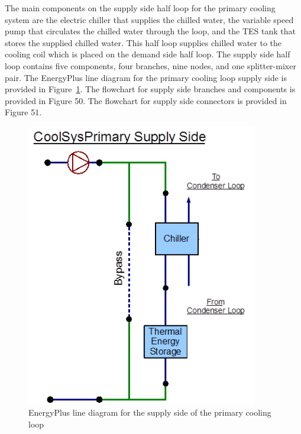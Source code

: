 The main components on the supply side half loop for the primary cooling system are the electric chiller that supplies the chilled water, the variable speed pump that circulates the chilled water through the loop, and the TES tank that stores the supplied chilled water. This half loop supplies chilled water to the cooling coil which is placed on the demand side half loop. The supply side half loop contains five components, four branches, nine nodes, and one splitter-mixer pair. The EnergyPlus line diagram for the primary cooling loop supply side is provided in Figure~\ref{fig:energyplus-line-diagram-for-the-supply-side-006}. The flowchart for supply side branches and components is provided in Figure 50. The flowchart for supply side connectors is provided in Figure 51.

\begin{figure}[hbtp] %
\centering
\includegraphics[width=0.9\textwidth, height=0.9\textheight, keepaspectratio=true]{media/image049.png}
\caption{EnergyPlus line diagram for the supply side of the primary cooling loop \protect \label{fig:energyplus-line-diagram-for-the-supply-side-006}}
\end{figure}

